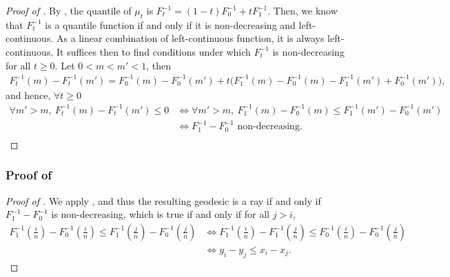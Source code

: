 \documentclass[twoside]{article}
\begin{document}
\begin{proof}[Proof of ]
    By \citep[Equation 7.2.8]{ambrosio2008gradient}, the quantile of $\mu_t$ is $F_t^{-1} = (1-t)F_0^{-1} + t F_1^{-1}$. Then, we know that $F_t^{-1}$ is a quantile function if and only if it is non-decreasing and left-continuous. As a linear combination of left-continuous function, it is always left-continuous. It suffices then to find conditions under which $F_t^{-1}$ is non-decreasing for all $t\ge 0$.
    Let $0<m<m'<1$, then
    \begin{equation}
        \begin{aligned}
            F_t^{-1}(m) -F_t^{-1}(m') = F_0^{-1}(m)-F_0^{-1}(m') + t\big(F_1^{-1}(m)-F_0^{-1}(m) - F_1^{-1}(m') + F_0^{-1}(m')\big),
        \end{aligned}
    \end{equation}
    and hence, $\forall t\ge 0$
    \begin{equation}
        \begin{aligned}
            \forall m'>m,\ F_t^{-1}(m)-F_t^{-1}(m') \le 0 &\iff \forall m'>m,\  F_1^{-1}(m)-F_0^{-1}(m) \le F_1^{-1}(m')-F_0^{-1}(m') \\ &\iff F_1^{-1}-F_0^{-1} \text{ non-decreasing}. \\
        \end{aligned}
    \end{equation}
\end{proof}


\subsubsection{Proof of } \label{proof:corr_1d_discrete_geod}

\begin{proof}[Proof of ]    
    We apply , and thus the resulting geodesic is a ray if and only if $F_1^{-1}-F_0^{-1}$ is non-decreasing, which is true if and only if for all $j>i$,
    \begin{equation}
        \begin{aligned}
            F_1^{-1}\left(\frac{i}{n}\right) - F_0^{-1}\left(\frac{i}{n}\right) \le F_1^{-1}\left(\frac{j}{n}\right) - F_0^{-1}\left(\frac{j}{n}\right) & \iff F_1^{-1}\left(\frac{i}{n}\right) - F_1^{-1}\left(\frac{j}{n}\right) \le F_0^{-1}\left(\frac{i}{n}\right) - F_0^{-1}\left(\frac{j}{n}\right) \\
            &\iff y_i - y_j \le x_i - x_j.
        \end{aligned}
    \end{equation}
\end{proof}
\end{document}

